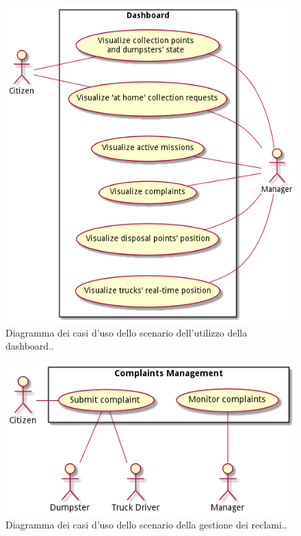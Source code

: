 \begin{figure}[H]
    \centering
    \includegraphics[width=\textwidth]{../img/dashboard-use-cases.pm}
    \caption{Diagramma dei casi d'uso dello scenario dell'utilizzo della dashboard..}
    \label{fig:dashboard-use-cases}
\end{figure}

\begin{figure}[H]
    \centering
    \includegraphics[width=\textwidth]{../img/complaints-use-cases.pm}
    \caption{Diagramma dei casi d'uso dello scenario della gestione dei reclami..}
    \label{fig:complaints-use-cases}
\end{figure}

